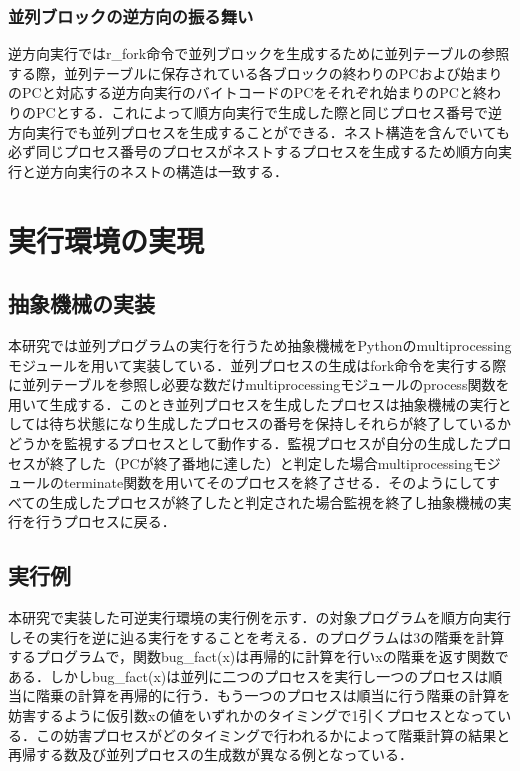 \documentclass[submit,PRO]{ipsj}
\begin{document}
\subsubsection{並列ブロックの逆方向の振る舞い}

逆方向実行ではr\_fork命令で並列ブロックを生成するために並列テーブルの参照する際，並列テーブルに保存されている各ブロックの終わりのPCおよび始まりのPCと対応する逆方向実行のバイトコードのPCをそれぞれ始まりのPCと終わりのPCとする．これによって順方向実行で生成した際と同じプロセス番号で逆方向実行でも並列プロセスを生成することができる．ネスト構造を含んでいても必ず同じプロセス番号のプロセスがネストするプロセスを生成するため順方向実行と逆方向実行のネストの構造は一致する．


\section{実行環境の実現}

\subsection{抽象機械の実装}

本研究では並列プログラムの実行を行うため抽象機械をPythonのmultiprocessingモジュールを用いて実装している．並列プロセスの生成はfork命令を実行する際に並列テーブルを参照し必要な数だけmultiprocessingモジュールのprocess関数を用いて生成する．このとき並列プロセスを生成したプロセスは抽象機械の実行としては待ち状態になり生成したプロセスの番号を保持しそれらが終了しているかどうかを監視するプロセスとして動作する．監視プロセスが自分の生成したプロセスが終了した（PCが終了番地に達した）と判定した場合multiprocessingモジュールのterminate関数を用いてそのプロセスを終了させる．そのようにしてすべての生成したプロセスが終了したと判定された場合監視を終了し抽象機械の実行を行うプロセスに戻る．


\subsection{実行例}
本研究で実装した可逆実行環境の実行例を示す．の対象プログラムを順方向実行しその実行を逆に辿る実行をすることを考える．のプログラムは3の階乗を計算するプログラムで，関数bug\_fact(x)は再帰的に計算を行いxの階乗を返す関数である．しかしbug\_fact(x)は並列に二つのプロセスを実行し一つのプロセスは順当に階乗の計算を再帰的に行う．もう一つのプロセスは順当に行う階乗の計算を妨害するように仮引数xの値をいずれかのタイミングで1引くプロセスとなっている．この妨害プロセスがどのタイミングで行われるかによって階乗計算の結果と再帰する数及び並列プロセスの生成数が異なる例となっている．
\end{document}
